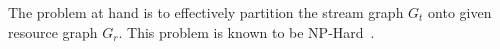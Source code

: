 \documentclass[10pt, conference, compsocconf, reqno]{IEEEtran}
\begin{document}

The problem at hand is to effectively partition the stream graph $G_t$ onto
given resource graph $G_r$. This problem is known to be
NP-Hard~\cite{vsar89}. %

\end{document}
